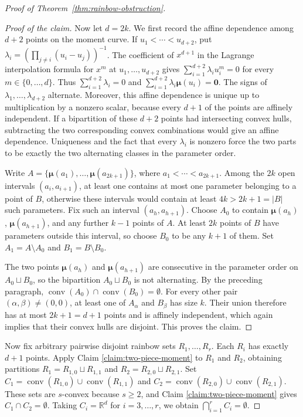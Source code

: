 \documentclass[11pt]{article}
\theoremstyle{definition}
\newenvironment{poc}{\begin{proof}[Proof of the claim]\renewcommand*{\qedsymbol}{\(\blacksquare\)}}{\end{proof}}
\newcommand*{\abs}[1]{\lvert#1\rvert}
\newcommand{\R}{\mathbb{R}}
\begin{document}
\begin{proof}[Proof of Theorem~\ref{thm:rainbow-obstruction}]
\begin{poc}
Now let \(d=2k\). We first record the affine dependence among \(d+2\) points on the moment curve. If \(u_{1}<\cdots<u_{d+2}\), put \(\lambda_{i}=\left(\prod_{j\ne i}(u_{i}-u_{j})\right)^{-1}\). The coefficient of \(x^{d+1}\) in the Lagrange interpolation formula for \(x^{m}\) at \(u_{1},\ldots,u_{d+2}\) gives \(\sum_{i=1}^{d+2}\lambda_{i}u_{i}^{m}=0\) for every \(m\in\{0,\ldots,d\}\). Thus \(\sum_{i=1}^{d+2}\lambda_{i}=0\) and \(\sum_{i=1}^{d+2}\lambda_{i}\boldsymbol{\mu}(u_{i})=\boldsymbol{0}\). The signs of \(\lambda_{1},\ldots,\lambda_{d+2}\) alternate. Moreover, this affine dependence is unique up to multiplication by a nonzero scalar, because every \(d+1\) of the points are affinely independent. If a bipartition of these \(d+2\) points had intersecting convex hulls, subtracting the two corresponding convex combinations would give an affine dependence. Uniqueness and the fact that every \(\lambda_{i}\) is nonzero force the two parts to be exactly the two alternating classes in the parameter order.

Write \(A=\{\boldsymbol{\mu}(a_{1}),\ldots,\boldsymbol{\mu}(a_{2k+1})\}\), where \(a_{1}<\cdots<a_{2k+1}\). Among the \(2k\) open intervals \((a_{i},a_{i+1})\), at least one contains at most one parameter belonging to a point of \(B\), otherwise these intervals would contain at least \(4k>2k+1=\abs{B}\) such parameters. Fix such an interval \((a_{h},a_{h+1})\). Choose \(A_{0}\) to contain \(\boldsymbol{\mu}(a_{h})\), \(\boldsymbol{\mu}(a_{h+1})\), and any further \(k-1\) points of \(A\). At least \(2k\) points of \(B\) have parameters outside this interval, so choose \(B_{0}\) to be any \(k+1\) of them. Set \(A_{1}=A\setminus A_{0}\) and \(B_{1}=B\setminus B_{0}\).

The two points \(\boldsymbol{\mu}(a_{h})\) and \(\boldsymbol{\mu}(a_{h+1})\) are consecutive in the parameter order on \(A_{0}\sqcup B_{0}\), so the bipartition \(A_{0}\sqcup B_{0}\) is not alternating. By the preceding paragraph, \(\operatorname{conv}(A_{0})\cap\operatorname{conv}(B_{0})=\emptyset\). For every other pair \((\alpha,\beta)\ne(0,0)\), at least one of \(A_{\alpha}\) and \(B_{\beta}\) has size \(k\). Their union therefore has at most \(2k+1=d+1\) points and is affinely independent, which again implies that their convex hulls are disjoint. This proves the claim.
\end{poc}

Now fix arbitrary pairwise disjoint rainbow sets \(R_{1},\ldots,R_{r}\). Each \(R_{i}\) has exactly \(d+1\) points. Apply Claim \ref{claim:two-piece-moment} to \(R_{1}\) and \(R_{2}\), obtaining partitions \(R_{1}=R_{1,0}\sqcup R_{1,1}\) and \(R_{2}=R_{2,0}\sqcup R_{2,1}\). Set \(C_{1}=\operatorname{conv}(R_{1,0})\cup\operatorname{conv}(R_{1,1})\) and \(C_{2}=\operatorname{conv}(R_{2,0})\cup\operatorname{conv}(R_{2,1})\). These sets are \(s\)-convex because \(s\ge2\), and Claim \ref{claim:two-piece-moment} gives \(C_{1}\cap C_{2}=\emptyset\). Taking \(C_{i}=\R^{d}\) for \(i=3,\ldots,r\), we obtain \(\bigcap_{i=1}^{r}C_{i}=\emptyset\).


\end{proof}
\end{document}
